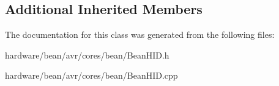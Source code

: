\subsection*{Additional Inherited Members}


The documentation for this class was generated from the following files\+:\begin{DoxyCompactItemize}
\item 
hardware/bean/avr/cores/bean/Bean\+H\+I\+D.\+h\item 
hardware/bean/avr/cores/bean/Bean\+H\+I\+D.\+cpp\end{DoxyCompactItemize}
